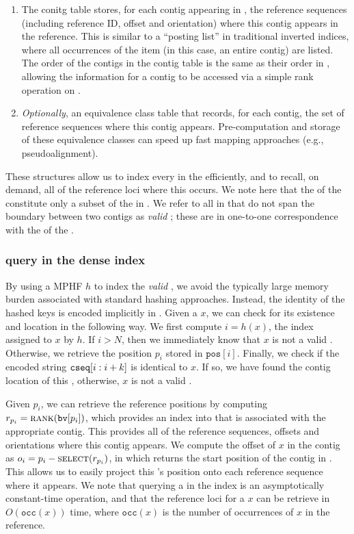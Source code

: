 \begin{enumerate}
\item The conitg table \ctab stores, for each contig appearing in \cseq, the reference
  sequences (including reference ID, offset and orientation) where this contig appears in the
  reference. This is similar to a ``posting list'' in traditional inverted
  indices, where all occurrences of the item (in this case, an entire \ccdbg
  contig) are listed. The order of the contigs in the contig table is the same
  as their order in \cseq, allowing the information for a contig to be accessed
  via a simple rank operation on \bv.

\label{items:dense5}

\item \emph{Optionally}, an equivalence class table that records, for each
  contig, the set of reference sequences where this contig appears.
  Pre-computation and storage of these equivalence classes can speed up fast
  mapping approaches (e.g., pseudoalignment).

\end{enumerate}

These structures allow us to index every \kmer in the \ccdbg efficiently, and to
recall, on demand, all of the reference loci where this \kmer occurs. We note
here that the \kmers of the \ccdbg constitute only a subset of the \kmers in
\cseq. We refer to all \kmers in \cseq that do not span the boundary between two
contigs as \emph{valid} \kmers; these are in one-to-one correspondence with the
\kmers of the \ccdbg.

\subsubsection*{\kmer query in the dense \pufferfish index}
By using a MPHF $h$ to index the \emph{valid} \kmers, we avoid the typically
large memory burden associated with standard hashing approaches. Instead, the
identity of the hashed keys is encoded implicitly in \cseq. Given a \kmer $x$, we
can check for its existence and location in the following way. We first compute
$i = h(x)$, the index assigned to \kmer $x$ by $h$. If $i > N$, then we
immediately know that $x$ is not a valid \kmer. Otherwise, we retrieve the
position $p_{i}$ stored in $\texttt{pos}[i]$. Finally, we check if the encoded
string $\texttt{cseq}[i:i+k]$ is identical to $x$. If so, we have found the
contig location of this \kmer, otherwise, $x$ is not a valid \kmer. 

Given $p_{i}$, we can retrieve the reference positions by computing $r_{p_i} =
\mbox{\sc rank}(\texttt{bv}[p_{i}])$, which provides an index into \ctab that is
associated with the appropriate contig. This provides all of the reference
sequences, offsets and orientations where this contig appears. We compute the
offset of \kmer $x$ in the contig as $o_{i} = p_{i} - \mbox{\sc select}(r_{p_i})$,
in which \select returns the start position of the contig in \ctab.
This allows us to easily project this \kmer's position onto each reference
sequence where it appears. We note that querying a \kmer in the \pufferfish index is
an asymptotically constant-time operation, and that the reference loci for a
\kmer $x$ can be retrieve in $O(\texttt{occ}(x))$ time, where $\texttt{occ}(x)$
is the number of occurrences of $x$ in the reference.

